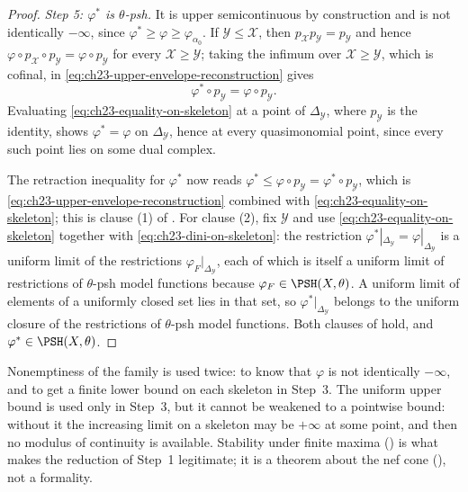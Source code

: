 \begin{proof}
\emph{Step 5: \(\varphi^*\) is \(\theta\)-psh.}  It is upper semicontinuous
by construction and is not identically \(-\infty\), since
\(\varphi^*\geq\varphi\geq\varphi_{\alpha_0}\).  If
\(\mathcal Y\leq\mathcal X\), then
\(p_{\mathcal X}p_{\mathcal Y}=p_{\mathcal Y}\) and hence
\(\varphi\circ p_{\mathcal X}\circ p_{\mathcal Y}
=\varphi\circ p_{\mathcal Y}\) for every \(\mathcal X\geq\mathcal Y\);
taking the infimum over \(\mathcal X\geq\mathcal Y\), which is cofinal, in
\eqref{eq:ch23-upper-envelope-reconstruction} gives
\begin{equation}\label{eq:ch23-equality-on-skeleton}
                   \varphi^*\circ p_{\mathcal Y}
                   =\varphi\circ p_{\mathcal Y}.
\end{equation}
Evaluating \eqref{eq:ch23-equality-on-skeleton} at a point of
\(\Delta_{\mathcal Y}\), where \(p_{\mathcal Y}\) is the identity, shows
\(\varphi^*=\varphi\) on \(\Delta_{\mathcal Y}\), hence at every
quasimonomial point, since every such point lies on some dual complex.

The retraction inequality for \(\varphi^*\) now reads
\(\varphi^*\leq\varphi\circ p_{\mathcal Y}=\varphi^*\circ p_{\mathcal Y}\),
which is \eqref{eq:ch23-upper-envelope-reconstruction} combined with
\eqref{eq:ch23-equality-on-skeleton}; this is clause (1) of
.  For clause (2), fix \(\mathcal Y\) and use
\eqref{eq:ch23-equality-on-skeleton} together with
\eqref{eq:ch23-dini-on-skeleton}: the restriction
\(\varphi^*|_{\Delta_{\mathcal Y}}=\varphi|_{\Delta_{\mathcal Y}}\) is a
uniform limit of the restrictions \(\varphi_F|_{\Delta_{\mathcal Y}}\), each
of which is itself a uniform limit of restrictions of \(\theta\)-psh model
functions because \(\varphi_F\in\PSH(X,\theta)\).  A uniform limit of
elements of a uniformly closed set lies in that set, so
\(\varphi^*|_{\Delta_{\mathcal Y}}\) belongs to the uniform closure of the
restrictions of \(\theta\)-psh model functions.  Both clauses of
 hold, and \(\varphi^*\in\PSH(X,\theta)\).
\end{proof}

\begin{remark}
\label{rem:ch23-upper-envelope-hypotheses}
Nonemptiness of the family is used twice: to know that \(\varphi\) is not
identically \(-\infty\), and to get a finite lower bound on each skeleton in
Step~3.  The uniform upper bound is used only in Step~3, but it cannot be
weakened to a pointwise bound: without it the increasing limit on a skeleton
may be \(+\infty\) at some point, and then no modulus of continuity is
available.  Stability under finite maxima
() is what makes the reduction of
Step~1 legitimate; it is a theorem about the nef cone
(), not a formality.
\end{remark}

